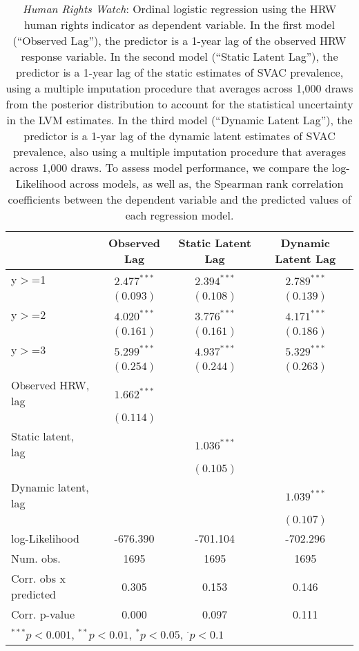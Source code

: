 
\begin{table}[h]
\begin{center}
\begin{tabular}{l c c c }
\hline
 & Observed Lag & Static Latent Lag & Dynamic Latent Lag \\
\hline
y$>$=1                & $2.477^{***}$ & $2.394^{***}$ & $2.789^{***}$ \\
                      & $(0.093)$     & $(0.108)$     & $(0.139)$     \\
y$>$=2                & $4.020^{***}$ & $3.776^{***}$ & $4.171^{***}$ \\
                      & $(0.161)$     & $(0.161)$     & $(0.186)$     \\
y$>$=3                & $5.299^{***}$ & $4.937^{***}$ & $5.329^{***}$ \\
                      & $(0.254)$     & $(0.244)$     & $(0.263)$     \\
Observed HRW, lag     & $1.662^{***}$ &               &               \\
                      & $(0.114)$     &               &               \\
Static  latent, lag   &               & $1.036^{***}$ &               \\
                      &               & $(0.105)$     &               \\
Dynamic latent, lag   &               &               & $1.039^{***}$ \\
                      &               &               & $(0.107)$     \\
\hline
log-Likelihood        & -676.390      & -701.104      & -702.296      \\
Num. obs.             & 1695          & 1695          & 1695          \\
Corr. obs x predicted & 0.305         & 0.153         & 0.146         \\
Corr. p-value         & 0.000         & 0.097         & 0.111         \\
\hline
\multicolumn{4}{l}{\scriptsize{$^{***}p<0.001$, $^{**}p<0.01$, $^*p<0.05$, $^{\cdot}p<0.1$}}
\end{tabular}
\caption{\emph{Human Rights Watch}: Ordinal logistic regression using the HRW human rights 
       indicator as dependent variable. In the first model (``Observed Lag''), the predictor is a 1-year lag
       of the observed HRW response variable. In the second model (``Static Latent Lag''), the predictor is a 1-year
       lag of the static estimates of SVAC prevalence, using a multiple imputation procedure that averages across 1,000 draws
        from the posterior distribution to account for the statistical uncertainty in the LVM estimates. 
       In the third model (``Dynamic Latent Lag''), the predictor is a 1-yar lag of the dynamic latent 
       estimates of SVAC prevalence, also using a multiple imputation procedure that averages across 1,000 draws. To assess
       model performance, we compare the log-Likelihood across models, as well as, the Spearman rank
       correlation coefficients between the dependent variable and the predicted values of each regression
       model.}
\label{xt-hrw}
\end{center}
\end{table}
